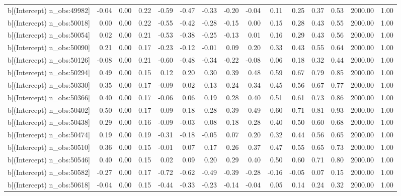 \begin{table}[ht]
\begin{tabular}{rrrrrrrrrrrrrrr}
  b[(Intercept) n\_obs:49982] & -0.04 & 0.00 & 0.22 & -0.59 & -0.47 & -0.33 & -0.20 & -0.04 & 0.11 & 0.25 & 0.37 & 0.53 & 2000.00 & 1.00 \\ 
  b[(Intercept) n\_obs:50018] & 0.00 & 0.00 & 0.22 & -0.55 & -0.42 & -0.28 & -0.15 & 0.00 & 0.15 & 0.28 & 0.43 & 0.55 & 2000.00 & 1.00 \\ 
  b[(Intercept) n\_obs:50054] & 0.02 & 0.00 & 0.21 & -0.53 & -0.38 & -0.25 & -0.13 & 0.01 & 0.16 & 0.29 & 0.43 & 0.56 & 2000.00 & 1.00 \\ 
  b[(Intercept) n\_obs:50090] & 0.21 & 0.00 & 0.17 & -0.23 & -0.12 & -0.01 & 0.09 & 0.20 & 0.33 & 0.43 & 0.55 & 0.64 & 2000.00 & 1.00 \\ 
  b[(Intercept) n\_obs:50126] & -0.08 & 0.00 & 0.21 & -0.60 & -0.48 & -0.34 & -0.22 & -0.08 & 0.06 & 0.18 & 0.32 & 0.44 & 2000.00 & 1.00 \\ 
  b[(Intercept) n\_obs:50294] & 0.49 & 0.00 & 0.15 & 0.12 & 0.20 & 0.30 & 0.39 & 0.48 & 0.59 & 0.67 & 0.79 & 0.85 & 2000.00 & 1.00 \\ 
  b[(Intercept) n\_obs:50330] & 0.35 & 0.00 & 0.17 & -0.09 & 0.02 & 0.13 & 0.24 & 0.34 & 0.45 & 0.56 & 0.67 & 0.77 & 2000.00 & 1.00 \\ 
  b[(Intercept) n\_obs:50366] & 0.40 & 0.00 & 0.17 & -0.06 & 0.06 & 0.19 & 0.28 & 0.40 & 0.51 & 0.61 & 0.73 & 0.86 & 2000.00 & 1.00 \\ 
  b[(Intercept) n\_obs:50402] & 0.50 & 0.00 & 0.17 & 0.09 & 0.18 & 0.28 & 0.39 & 0.49 & 0.60 & 0.71 & 0.81 & 0.93 & 2000.00 & 1.00 \\ 
  b[(Intercept) n\_obs:50438] & 0.29 & 0.00 & 0.16 & -0.09 & -0.03 & 0.08 & 0.18 & 0.28 & 0.40 & 0.50 & 0.60 & 0.68 & 2000.00 & 1.00 \\ 
  b[(Intercept) n\_obs:50474] & 0.19 & 0.00 & 0.19 & -0.31 & -0.18 & -0.05 & 0.07 & 0.20 & 0.32 & 0.44 & 0.56 & 0.65 & 2000.00 & 1.00 \\ 
  b[(Intercept) n\_obs:50510] & 0.36 & 0.00 & 0.15 & -0.01 & 0.07 & 0.17 & 0.26 & 0.37 & 0.47 & 0.55 & 0.65 & 0.73 & 2000.00 & 1.00 \\ 
  b[(Intercept) n\_obs:50546] & 0.40 & 0.00 & 0.15 & 0.02 & 0.09 & 0.20 & 0.29 & 0.40 & 0.50 & 0.60 & 0.71 & 0.80 & 2000.00 & 1.00 \\ 
  b[(Intercept) n\_obs:50582] & -0.27 & 0.00 & 0.17 & -0.72 & -0.62 & -0.49 & -0.39 & -0.28 & -0.16 & -0.05 & 0.07 & 0.15 & 2000.00 & 1.00 \\ 
  b[(Intercept) n\_obs:50618] & -0.04 & 0.00 & 0.15 & -0.44 & -0.33 & -0.23 & -0.14 & -0.04 & 0.05 & 0.14 & 0.24 & 0.32 & 2000.00 & 1.00 \\ 

\end{tabular}
\end{table}
